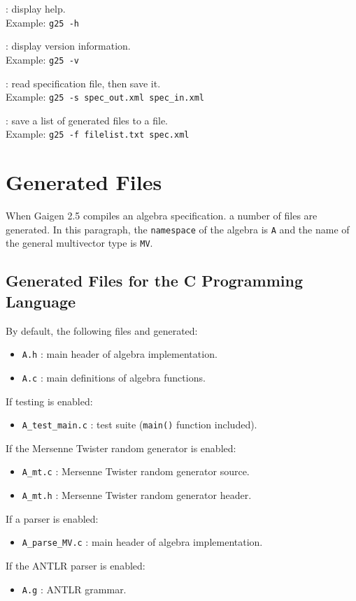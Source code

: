 \documentclass[10pt, a4paper]{article}
\begin{document}
\vspace*{2mm}

: display help.\\
Example: {\tt g25 -h}

\vspace*{2mm}

: display version information.\\
Example: {\tt g25 -v}

\vspace*{2mm}

: read specification file, then save it.\\
Example: {\tt g25 -s spec\_out.xml spec\_in.xml}

\vspace*{2mm}

: save a list of generated files to a file.\\
Example: {\tt g25 -f filelist.txt spec.xml}

\section{Generated Files}

When Gaigen 2.5 compiles an algebra specification. a number of files
are generated.
In this paragraph, the {\tt namespace} of the algebra is {\tt A} and
the name of the general multivector type is {\tt MV}.

\subsection{Generated Files for the C Programming Language}

By default, the following files and generated:
\begin{itemize}
\item {\tt A.h} : main header of algebra implementation.
\item {\tt A.c} : main definitions of algebra functions.
\end{itemize}
If testing is enabled:
\begin{itemize}
\item {\tt A\_test\_main.c} : test suite ({\tt main()} function included).
\end{itemize}
If the Mersenne Twister random generator is enabled:
\begin{itemize}
\item {\tt A\_mt.c} : Mersenne Twister random generator source.
\item {\tt A\_mt.h} : Mersenne Twister random generator header.
\end{itemize}
If a parser is enabled:
\begin{itemize}
\item {\tt A\_parse\_MV.c} : main header of algebra implementation.
\end{itemize}
If the ANTLR parser is enabled:
\begin{itemize}
\item {\tt A.g} : ANTLR grammar.
\end{itemize}
\end{document}
